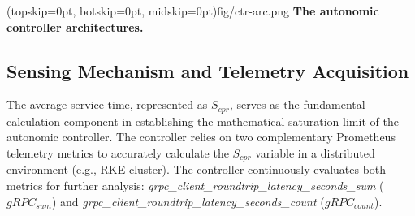 \documentclass{ieeeaccess}
\begin{document}

\Figure[t!](topskip=0pt, botskip=0pt, midskip=0pt){fig/ctr-arc.png}
{ 
	\textbf{The autonomic controller architectures.}
	\label{fig:ctr-arc}
}



\subsection{Sensing Mechanism and Telemetry Acquisition}
\label{sec3.1}
The average service time, represented as $S_{cpr}$, serves as the fundamental calculation component in establishing the mathematical saturation limit of the autonomic controller. The controller relies on two complementary Prometheus telemetry metrics to accurately calculate the $S_{cpr}$ variable in a distributed environment (e.g., RKE cluster). The controller continuously evaluates both metrics for further analysis: \textit{grpc\_client\_roundtrip\_latency\_seconds\_sum} ($gRPC_{sum}$) and \textit{grpc\_client\_roundtrip\_latency\_seconds\_count} ($gRPC_{count}$).
\end{document}
